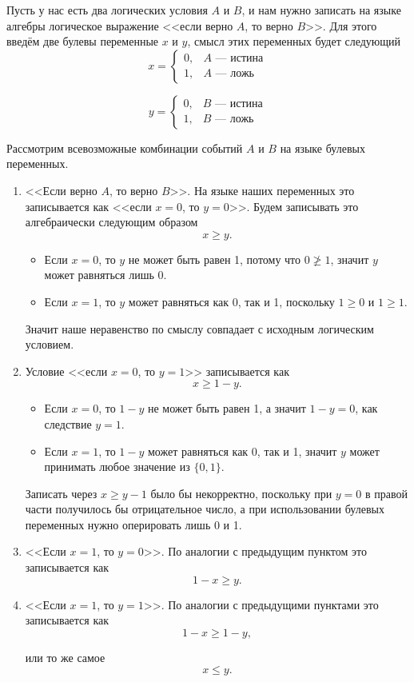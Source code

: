 \label{fact:simple_conditions}

Пусть у нас есть два логических условия $A$ и $B$, и нам нужно записать на языке алгебры логическое выражение <<если верно $A$, то верно $B$>>. Для этого введём две булевы переменные $x$ и $y$, смысл этих переменных будет следующий
\[
x = \begin{cases}
	0, & \text{$A$ --- истина} \\
	1, & \text{$A$ --- ложь}
\end{cases}
\]

\[
y = \begin{cases}
	0, & \text{$B$ --- истина} \\
	1, & \text{$B$ --- ложь}
\end{cases}
\]

Рассмотрим всевозможные комбинации событий $A$ и $B$ на языке булевых переменных.

\begin{enumerate}[nosep]
	\item <<Если верно $A$, то верно $B$>>. На языке наших переменных это записывается как <<если $x = 0$, то $y = 0$>>. Будем записывать это алгебраически следующим образом
	\[
	x \ge y.
	\]
	
	\begin{itemize}[nosep]
		\item Если $x = 0$, то $y$ не может быть равен 1, потому что $0 \ngeq 1$, значит $y$ может равняться лишь 0.
		
		\item Если $x = 1$, то $y$ может равняться как 0, так и 1, поскольку $1 \ge 0$ и $1 \ge 1$.
	\end{itemize}
	
	Значит наше неравенство по смыслу совпадает с исходным логическим условием.
	
	\item Условие <<если $x = 0$, то $y = 1$>> записывается как
	\[
	x \ge 1 - y.
	\]
	
	\begin{itemize}[nosep]
		\item Если $x = 0$, то $1-y$ не может быть равен 1, а значит $1-y=0$, как следствие $y = 1$.
		
		\item Если $x = 1$, то $1-y$ может равняться как 0, так и 1, значит $y$ может принимать любое значение из $\{0, 1\}$.
	\end{itemize}
	
	Записать через $x \ge y - 1$ было бы некорректно, поскольку при $y = 0$ в правой части получилось бы отрицательное число, а при использовании булевых переменных нужно оперировать лишь 0 и 1.
	
	\item <<Если $x = 1$, то $y = 0$>>. По аналогии с предыдущим пунктом это записывается как
	\[
	1-x \ge y.
	\]
	
	\item <<Если $x = 1$, то $y = 1$>>. По аналогии с предыдущими пунктами это записывается как
	\[
	1-x \ge 1 - y,
	\]
	
	или то же самое
	\[
	x \le y.
	\]
	
\end{enumerate}

